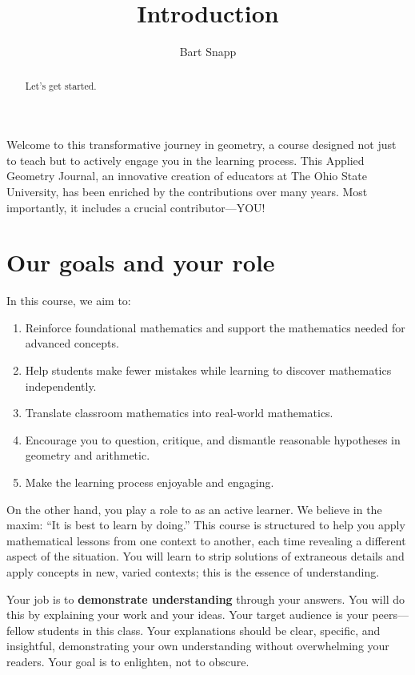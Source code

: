 \documentclass[handout,nooutcomes,noauthor]{ximera}
\title{Introduction}
\author{Bart Snapp}
\begin{document}
\begin{abstract}
  Let's get started.
\end{abstract}
\maketitle





Welcome to this transformative journey in geometry, a course designed
not just to teach but to actively engage you in the learning
process. This Applied Geometry Journal, an innovative creation of
educators at The Ohio State University, has been enriched by the
contributions over many years. Most importantly, it includes a crucial
contributor---YOU!






\section{Our goals and your role}


In this course, we aim to:
\begin{enumerate}
\item Reinforce foundational mathematics and support the mathematics needed for advanced concepts.
\item Help students make fewer mistakes while learning to discover mathematics independently.
\item Translate classroom mathematics into real-world mathematics.
\item Encourage you to question, critique, and dismantle reasonable
  hypotheses in geometry and arithmetic.
\item Make the learning process enjoyable and engaging.
\end{enumerate}


On the other hand, you play a role to as an active learner. We believe
in the maxim: ``It is best to learn by doing.'' This course is
structured to help you apply mathematical lessons from one context to
another, each time revealing a different aspect of the situation. You
will learn to strip solutions of extraneous details and apply concepts
in new, varied contexts; this is the essence of understanding.

Your job is to \textbf{demonstrate understanding} through your
answers. You will do this by explaining your work and your ideas.
Your target audience is your peers—fellow students in this class. Your
explanations should be clear, specific, and insightful, demonstrating
your own understanding without overwhelming your readers. Your goal is
to enlighten, not to obscure.
\end{document}
